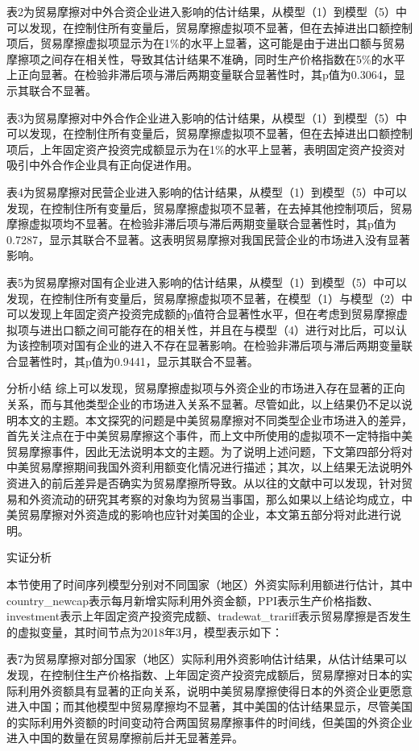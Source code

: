 \documentclass[]{article}
\begin{document}
表2为贸易摩擦对中外合资企业进入影响的估计结果，从模型（1）到模型（5）中可以发现，在控制住所有变量后，贸易摩擦虚拟项不显著，但在去掉进出口额控制项后，贸易摩擦虚拟项显示为在1\%的水平上显著，这可能是由于进出口额与贸易摩擦项之间存在相关性，导致其估计结果不准确，同时生产价格指数在5\%的水平上正向显著。在检验非滞后项与滞后两期变量联合显著性时，其p值为0.3064，显示其联合不显著。

表3为贸易摩擦对中外合作企业进入影响的估计结果，从模型（1）到模型（5）中可以发现，在控制住所有变量后，贸易摩擦虚拟项不显著，但在去掉进出口额控制项后，上年固定资产投资完成额显示为在1\%的水平上显著，表明固定资产投资对吸引中外合作企业具有正向促进作用。

表4为贸易摩擦对民营企业进入影响的估计结果，从模型（1）到模型（5）中可以发现，在控制住所有变量后，贸易摩擦虚拟项不显著，在去掉其他控制项后，贸易摩擦虚拟项均不显著。在检验非滞后项与滞后两期变量联合显著性时，其p值为0.7287，显示其联合不显著。这表明贸易摩擦对我国民营企业的市场进入没有显著影响。

表5为贸易摩擦对国有企业进入影响的估计结果，从模型（1）到模型（5）中可以发现，在控制住所有变量后，贸易摩擦虚拟项不显著，在模型（1）与模型（2）中可以发现上年固定资产投资完成额的p值符合显著性水平，但在考虑到贸易摩擦虚拟项与进出口额之间可能存在的相关性，并且在与模型（4）进行对比后，可以认为该控制项对国有企业的进入不存在显著影响。在检验非滞后项与滞后两期变量联合显著性时，其p值为0.9441，显示其联合不显著。

分析小结
综上可以发现，贸易摩擦虚拟项与外资企业的市场进入存在显著的正向关系，而与其他类型企业的市场进入关系不显著。尽管如此，以上结果仍不足以说明本文的主题。本文探究的问题是中美贸易摩擦对不同类型企业市场进入的差异，首先关注点在于中美贸易摩擦这个事件，而上文中所使用的虚拟项不一定特指中美贸易摩擦事件，因此无法说明本文的主题。为了说明上述问题，下文第四部分将对中美贸易摩擦期间我国外资利用额变化情况进行描述；其次，以上结果无法说明外资进入的前后差异是否确实为贸易摩擦所导致。从以往的文献中可以发现，针对贸易和外资流动的研究其考察的对象均为贸易当事国，那么如果以上结论均成立，中美贸易摩擦对外资造成的影响也应针对美国的企业，本文第五部分将对此进行说明。

实证分析

本节使用了时间序列模型分别对不同国家（地区）外资实际利用额进行估计，其中country\_newcap表示每月新增实际利用外资金额，PPI表示生产价格指数、investment表示上年固定资产投资完成额、tradewat\_trariff表示贸易摩擦是否发生的虚拟变量，其时间节点为2018年3月，模型表示如下：

表7为贸易摩擦对部分国家（地区）实际利用外资影响估计结果，从估计结果可以发现，在控制住生产价格指数、上年固定资产投资完成额后，贸易摩擦对日本的实际利用外资额具有显著的正向关系，说明中美贸易摩擦使得日本的外资企业更愿意进入中国；而其他模型中贸易摩擦均不显著，其中美国的估计结果显示，尽管美国的实际利用外资额的时间变动符合两国贸易摩擦事件的时间线，但美国的外资企业进入中国的数量在贸易摩擦前后并无显著差异。
\end{document}
